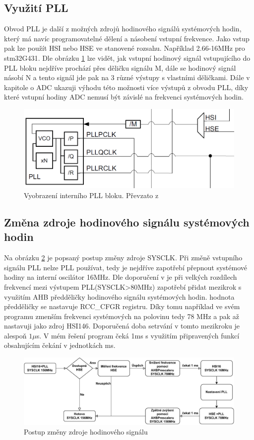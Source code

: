 \subsection{Využití PLL}
Obvod PLL je další z možných zdrojů hodinového signálů systémových hodin, který má navíc programovatelné dělení a násobení vstupní frekvence. Jako vstup pak lze použít HSI nebo HSE ve stanovené rozsahu. Například 2.66-16MHz  pro stm32G431\cite{dataG431}. Dle obrázku \ref{fig:plldiagram} lze vidět, jak vstupní hodinový signál vstupujícího do PLL bloku  nejdříve prochází přes děličku signálu M, dále se hodinový signál násobí N a tento signál jde pak na 3 různé výstupy s vlastními děličkami. Dále v kapitole o ADC ukazuji výhodu této možnosti více výstupů z obvodu PLL, díky které vstupní hodiny ADC nemusí být závislé na frekvenci systémových hodin. 

\begin{figure}[H]
	\centering
	\includegraphics[width=0.6\linewidth]{Figs/Documentation/PLL_Diagram}
	\caption{Vyobrazení interního PLL bloku. Převzato z}
	\label{fig:plldiagram}
\end{figure}    

\subsection{Změna zdroje hodinového signálu systémových hodin}
Na obrázku \ref{fig:hsekonfigurace} je popsaný postup změny zdroje SYSCLK. Při změně vstupního signálu PLL nelze PLL používat, tedy je nejdříve zapotřebí přepnout systémové hodiny na interní oscilátor 16MHz. Dle doporučení v \cite{refG4} je při velkých rozdílech frekvencí mezi výstupem PLL(SYSCLK>80MHz) zapotřebí přidat mezikrok s využitím AHB předděličky hodinového signálu systémových hodin. hodnota předděličky se nastavuje RCC\_CFGR registru. Díky tomu například ve svém programu zmenším frekvenci systémových na polovinu tedy 78 MHz a pak až nastavuji jako zdroj HSI146. Doporučená doba setrvání v tomto mezikroku je alespoň $1\mu$s. V mém řešení program čeká 1ms s využitím připravených funkcí obsahujícím čekání v jednotkách ms.


\begin{figure}[H]
	\centering
	\includegraphics[width=1\linewidth]{Figs/Documentation/HSE_Konfigurace}
	\caption{Postup změny zdroje hodinového signálu}
	\label{fig:hsekonfigurace}
\end{figure}

